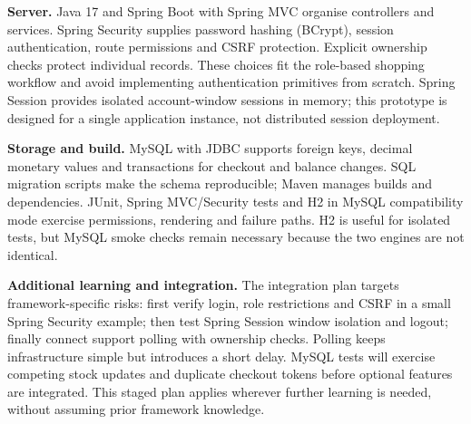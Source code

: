 \textbf{Server.} Java 17 and Spring Boot with Spring MVC organise controllers and services. Spring Security supplies password hashing (BCrypt), session authentication, route permissions and CSRF protection. Explicit ownership checks protect individual records. These choices fit the role-based shopping workflow and avoid implementing authentication primitives from scratch. Spring Session provides isolated account-window sessions in memory; this prototype is designed for a single application instance, not distributed session deployment.

\textbf{Storage and build.} MySQL with JDBC supports foreign keys, decimal monetary values and transactions for checkout and balance changes. SQL migration scripts make the schema reproducible; Maven manages builds and dependencies. JUnit, Spring MVC/Security tests and H2 in MySQL compatibility mode exercise permissions, rendering and failure paths. H2 is useful for isolated tests, but MySQL smoke checks remain necessary because the two engines are not identical.

\textbf{Additional learning and integration.} The integration plan targets framework-specific risks: first verify login, role restrictions and CSRF in a small Spring Security example; then test Spring Session window isolation and logout; finally connect support polling with ownership checks. Polling keeps infrastructure simple but introduces a short delay. MySQL tests will exercise competing stock updates and duplicate checkout tokens before optional features are integrated. This staged plan applies wherever further learning is needed, without assuming prior framework knowledge.

